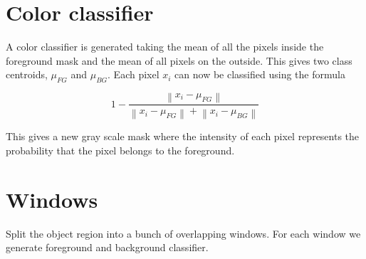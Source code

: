 \documentclass[12pt]{article}
\newcommand{\norm}[1]{\left\lVert#1\right\rVert}
\begin{document}
\section{Color classifier}

A color classifier is generated taking the mean of all the pixels inside the foreground mask and the mean of all pixels on the outside. This gives two class centroids, $\mu_{FG}$ and $\mu_{BG}$. Each pixel $x_i$ can now be classified using the formula 

\[
1 - \frac{\norm{x_i - \mu_{FG}}}{\norm{x_i - \mu_{FG}}+\norm{x_i - \mu_{BG}}}
\]

This gives a new gray scale mask where the intensity of each pixel represents the probability that the pixel belongs to the foreground.

\section{Windows}



Split the object region into a bunch of overlapping windows. For each window we generate foreground and background classifier.
\end{document}
